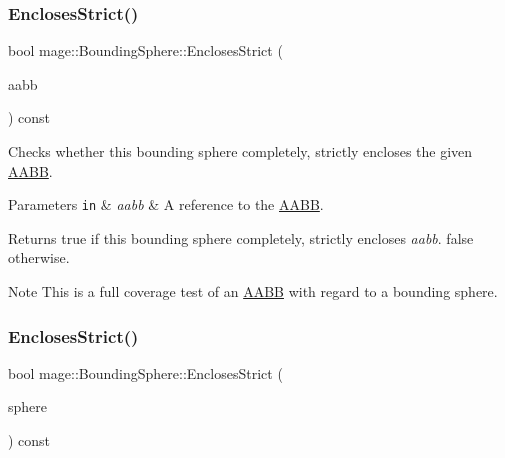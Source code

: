 \subsubsection{\texorpdfstring{Encloses\+Strict()}{EnclosesStrict()}\hspace{0.1cm}{\footnotesize\ttfamily [3/4]}}
{\footnotesize\ttfamily bool mage\+::\+Bounding\+Sphere\+::\+Encloses\+Strict (\begin{DoxyParamCaption}\item[{const \hyperlink{classmage_1_1_a_a_b_b}{A\+A\+BB} \&}]{aabb }\end{DoxyParamCaption}) const\hspace{0.3cm}{\ttfamily [noexcept]}}

Checks whether this bounding sphere completely, strictly encloses the given \hyperlink{classmage_1_1_a_a_b_b}{A\+A\+BB}.


\begin{DoxyParams}[1]{Parameters}
\mbox{\tt in}  & {\em aabb} & A reference to the \hyperlink{classmage_1_1_a_a_b_b}{A\+A\+BB}. \\
\hline
\end{DoxyParams}
\begin{DoxyReturn}{Returns}
{\ttfamily true} if this bounding sphere completely, strictly encloses {\itshape aabb}. {\ttfamily false} otherwise. 
\end{DoxyReturn}
\begin{DoxyNote}{Note}
This is a full coverage test of an \hyperlink{classmage_1_1_a_a_b_b}{A\+A\+BB} with regard to a bounding sphere. 
\end{DoxyNote}
\hypertarget{classmage_1_1_bounding_sphere_a8f0fc134762fb9a00b47d62cc09c7703}{}\label{classmage_1_1_bounding_sphere_a8f0fc134762fb9a00b47d62cc09c7703} 
\subsubsection{\texorpdfstring{Encloses\+Strict()}{EnclosesStrict()}\hspace{0.1cm}{\footnotesize\ttfamily [4/4]}}
{\footnotesize\ttfamily bool mage\+::\+Bounding\+Sphere\+::\+Encloses\+Strict (\begin{DoxyParamCaption}\item[{const \hyperlink{classmage_1_1_bounding_sphere}{Bounding\+Sphere} \&}]{sphere }\end{DoxyParamCaption}) const\hspace{0.3cm}{\ttfamily [noexcept]}}

